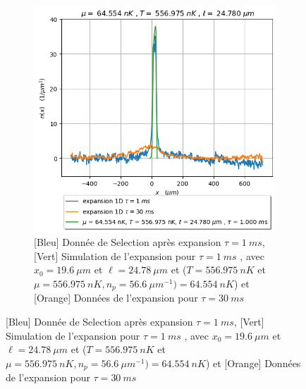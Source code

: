 \documentclass[a3, 10pt,twoside]{article}          %
\theoremstyle{plain}
\theoremstyle{definition}
\theoremstyle{remark}
\theoremstyle{definition} %
\begin{document}
\begin{figure}[H]
\begin{subfigure}[b]{0.45\textwidth}
        		\centering
        		\includegraphics[width=\textwidth]{Figures/simul_expansion_1_24-04-2024}
        		\caption{{\color{blue}[Bleu] Donnée de Selection après expansion $\tau = 1~ms$}, {\color{OliveGreen}[Vert]  Simulation de l'expansion pour $\tau= 1~ms$  , avec $x_0 = 19.6~\mu m$ et $\ell = 24.78~\mu m$ et ($T = 556.975 ~nK$ et $\mu=556.975 ~nK  , n_p = 56.6 ~{\mu m}^{-1} )= 64.554~nK$)} et { \color{orange}[Orange] Données de l'expansion pour $\tau = 30~ms$  } }
        		\label{fig:expansion1}
    		\end{subfigure}
    		
    		\vspace{1em}
    		

\end{figure}
\end{document}
